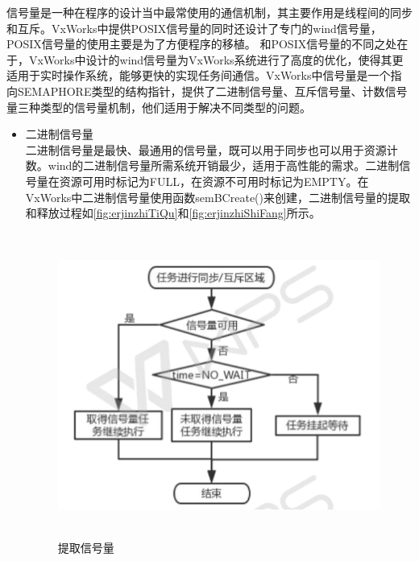 	
	信号量是一种在程序的设计当中最常使用的通信机制，其主要作用是线程间的同步和互斥。VxWorks中提供POSIX信号量的同时还设计了专门的wind信号量，POSIX信号量的使用主要是为了方便程序的移植。
	和POSIX信号量的不同之处在于，VxWorks中设计的wind信号量为VxWorks系统进行了高度的优化，使得其更适用于实时操作系统，能够更快的实现任务间通信。VxWorks中信号量是一个指向SEMAPHORE类型的结构指针，提供了二进制信号量、互斥信号量、计数信号量三种类型的信号量机制，他们适用于解决不同类型的问题。
	
\begin{itemize}
\item 二进制信号量\\
	二进制信号量是最快、最通用的信号量，既可以用于同步也可以用于资源计数。wind的二进制信号量所需系统开销最少，适用于高性能的需求。二进制信号量在资源可用时标记为FULL，在资源不可用时标记为EMPTY。在VxWorks中二进制信号量使用函数semBCreate()来创建，二进制信号量的提取和释放过程如\autoref{fig:erjinzhiTiQu}和\autoref{fig:erjinzhiShiFang}所示。

\begin{figure}[!h]
\centering
\includegraphics[width=13cm , height=10cm]{./graphics/erjinzhiTiQu.pdf}
  \caption{提取信号量}\label{fig:erjinzhiTiQu}
\end{figure}


\end{itemize}
